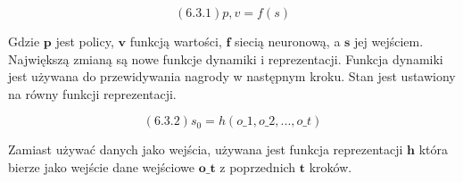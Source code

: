 \begin{equation}
(6.3.1) p, v = f(s)
\end{equation}

\noindent Gdzie $\boldsymbol{p}$ jest policy, $\boldsymbol{v}$ funkcją wartości, $\boldsymbol{f}$ siecią neuronową, a $\boldsymbol{s}$ jej wejściem.
Największą zmianą są nowe funkcje dynamiki i reprezentacji. Funkcja dynamiki jest używana do przewidywania nagrody w następnym kroku. Stan jest ustawiony na równy funkcji reprezentacji.

\begin{equation}
(6.3.2) s_0 = h(o\_1, o\_2, ..., o\_t)
\end{equation}

\noindent Zamiast używać danych jako wejścia, używana jest funkcja reprezentacji $\boldsymbol{h}$ która bierze jako wejście dane wejściowe $\boldsymbol{o\_t}$ z poprzednich $\boldsymbol{t}$ kroków.\newline

